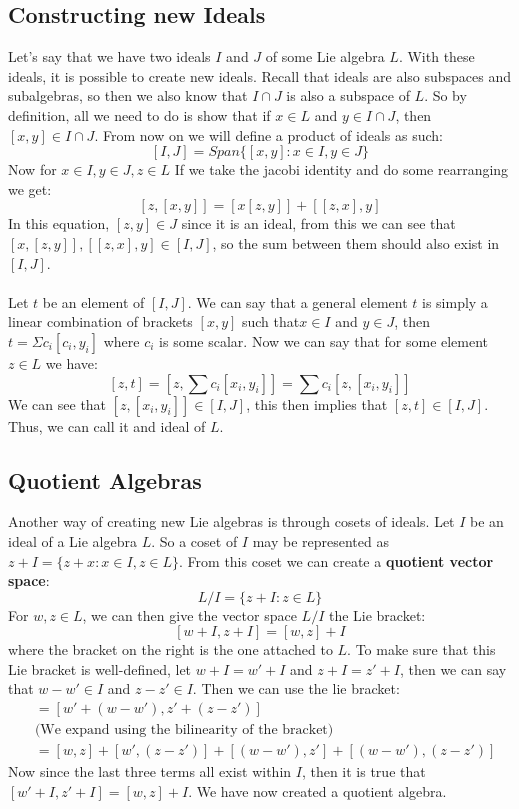 \documentclass[12pt, letterpaper]{article}
\begin{document}
\subsection{Constructing new Ideals}
Let's say that we have two ideals $I$ and $J$ of some Lie algebra $L$. With these ideals, it is possible to create new ideals. Recall that ideals are also subspaces and subalgebras, so then we also know that $I \cap J$ is also a subspace of $L$. So by definition, all we need to do is show that if $x \in L$ and $y \in I \cap J$, then $[x, y] \in I \cap J$. From now on we will define a product of ideals as such:
\[ [I,J] = Span\{[x,y] : x \in I, y\in J\} \]
Now for $x \in I, y \in J, z \in L$ If we take the jacobi identity and do some rearranging we get:
\[ [z,[x,y]] = [x[z,y]] + [[z,x],y] \]
In this equation, $[z,y] \in J$ since it is an ideal, from this we can see that $[x,[z,y]], [[z,x],y] \in [I,J]$, so the sum between them should also exist in $[I,J]$.\\\\
Let $t$ be an element of $[I,J]$. We can say that a general element $t$ is simply a linear combination of brackets $[x,y]$ such that$x \in I$ and $y \in J$, then $t = \Sigma c_i [c_i, y_i]$ where $c_i$ is some scalar. Now we can say that for some element $z \in L$ we have:
\[ [z,t] = \left[ z, \sum c_i[x_i,y_i] \right] = \sum c_i [z, [x_i, y_i]]\]
We can see that $[z, [x_i, y_i]] \in [I,J]$, this then implies that $[z,t] \in [I,J]$. Thus, we can call it and ideal of $L$.


\subsection{Quotient Algebras}
Another way of creating new Lie algebras is through cosets of ideals. Let $I$ be an ideal of a Lie algebra $L$. So a coset of $I$ may be represented as $z + I = \{ z + x : x \in I, z\in L \}$. From this coset we can create a \textbf{quotient vector space}:
\[ L/I = \{ z+I:z \in L \} \]
For $w,z \in L$, we can then give the vector space $L/I$ the Lie bracket:
\[ [w + I, z + I] = [w,z] + I \]
where the bracket on the right is the one attached to $L$. To make sure that this Lie bracket is well-defined, let $w + I = w' + I$ and $z + I = z' + I$, then we can say that $w - w' \in I$ and $z - z' \in I$. Then we can use the lie bracket:
\begin{align*}
[w',z'] &= [w' + (w - w'), z' + (z - z')]\\
& \text{(We expand using the bilinearity of the bracket)} \\
&= [w,z] + [w',(z-z')] + [(w-w'),z'] + [(w-w'),(z-z')]
\end{align*}
Now since the last three terms all exist within $I$, then it is true that $[w' + I, z' + I] = [w,z] + I$. We have now created a quotient algebra.
\end{document}
